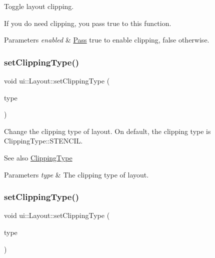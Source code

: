 Toggle layout clipping.

If you do need clipping, you pass true to this function.


\begin{DoxyParams}{Parameters}
{\em enabled} & \hyperlink{classPass}{Pass} true to enable clipping, false otherwise. \\
\hline
\end{DoxyParams}
\mbox{\label{classui_1_1Layout_aed2e7279ffe4d9fda5820917a36b71db}} 
\subsubsection{\texorpdfstring{set\+Clipping\+Type()}{setClippingType()}\hspace{0.1cm}{\footnotesize\ttfamily [1/2]}}
{\footnotesize\ttfamily void ui\+::\+Layout\+::set\+Clipping\+Type (\begin{DoxyParamCaption}\item[{\hyperlink{classui_1_1Layout_acd2a398e83d7d467e9565d4db171c865}{Clipping\+Type}}]{type }\end{DoxyParamCaption})}

Change the clipping type of layout. On default, the clipping type is {\ttfamily Clipping\+Type\+::\+S\+T\+E\+N\+C\+IL}. \begin{DoxySeeAlso}{See also}
{\ttfamily \hyperlink{classui_1_1Layout_acd2a398e83d7d467e9565d4db171c865}{Clipping\+Type}} 
\end{DoxySeeAlso}

\begin{DoxyParams}{Parameters}
{\em type} & The clipping type of layout. \\
\hline
\end{DoxyParams}
\mbox{\label{classui_1_1Layout_aed2e7279ffe4d9fda5820917a36b71db}} 
\subsubsection{\texorpdfstring{set\+Clipping\+Type()}{setClippingType()}\hspace{0.1cm}{\footnotesize\ttfamily [2/2]}}
{\footnotesize\ttfamily void ui\+::\+Layout\+::set\+Clipping\+Type (\begin{DoxyParamCaption}\item[{\hyperlink{classui_1_1Layout_acd2a398e83d7d467e9565d4db171c865}{Clipping\+Type}}]{type }\end{DoxyParamCaption})}

